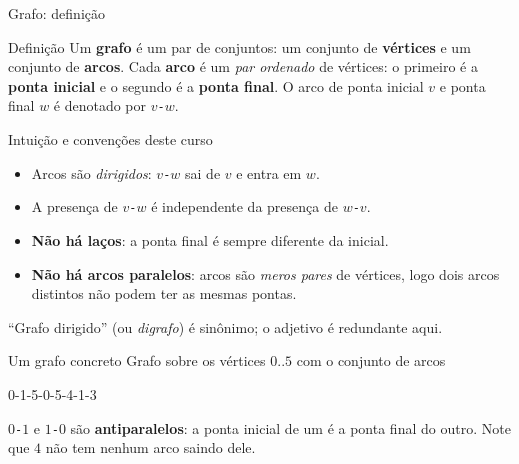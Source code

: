 \documentclass[aspectratio=169]{beamer}
\begin{document}
\begin{frame}{Grafo: definição}
  \begin{block}{Definição}
    {\small Um \textbf{grafo} é um par de conjuntos: um conjunto de
    \textbf{vértices} e um conjunto de \textbf{arcos}. Cada \textbf{arco} é um
    \emph{par ordenado} de vértices: o primeiro é a \textbf{ponta inicial} e o
    segundo é a \textbf{ponta final}. O arco de ponta inicial $v$ e ponta final
    $w$ é denotado por $v$\texttt{-}$w$.}
  \end{block}
  \begin{exampleblock}{Intuição e convenções deste curso}
    {\small
    \begin{itemize}\scriptsize
      \item Arcos são \emph{dirigidos}: $v$\texttt{-}$w$ sai de $v$ e entra em $w$.
      \item A presença de $v$\texttt{-}$w$ é independente da presença de $w$\texttt{-}$v$.
      \item \textbf{Não há laços}: a ponta final é sempre diferente da inicial.
      \item \textbf{Não há arcos paralelos}: arcos são \emph{meros pares} de vértices,
            logo dois arcos distintos não podem ter as mesmas pontas.
    \end{itemize}}
  \end{exampleblock}
  {\scriptsize ``Grafo dirigido'' (ou \emph{digrafo}) é sinônimo; o adjetivo é redundante aqui.}
\end{frame}

\begin{frame}{Um grafo concreto}
  {\small Grafo sobre os vértices $0..5$ com o conjunto de arcos}
  \begin{center}\ttfamily\small 0-1-5-0-5-4-1-3\end{center}
  \begin{center}
  \end{center}
  {\scriptsize $0$\texttt{-}$1$ e $1$\texttt{-}$0$ são \textbf{antiparalelos}: a ponta inicial de um é a ponta final do outro.
  Note que $4$ não tem nenhum arco saindo dele.}
\end{frame}
\end{document}
